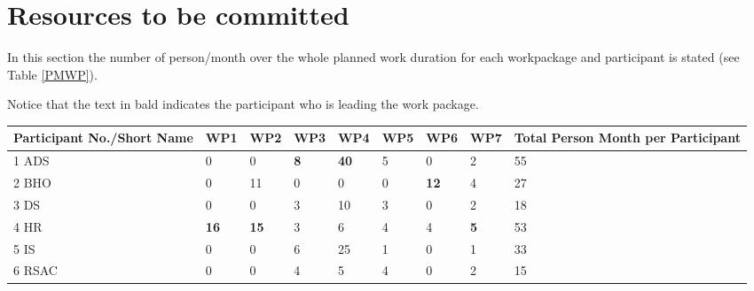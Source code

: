 \section{Resources to be committed}

In this section the number of person/month over the whole planned work duration for each workpackage and participant is stated (see Table \ref{PMWP}).

Notice that the text in bald indicates the participant who is leading the work package.

\begin{table}[H]
	\centering
	\begin{tabular}{p{1.9cm} p{1cm} p{1cm} p{1cm} p{1cm} p{1cm} p{1cm} p{1cm} | p{2.3cm}}
		\toprule[2pt]
		
		\textbf{Participant No./Short Name} & \textbf{WP1} & \textbf{WP2} & \textbf{WP3} & \textbf{WP4} & \textbf{WP5} & \textbf{WP6} & \textbf{WP7} & \textbf{Total Person Month per Participant} \\
		
		\midrule[1.5pt] 
		
		 1 ADS & 0 & 0 & \textbf{8} & \textbf{40} & 5 & 0 & 2 &  55 \vspace{0.2cm} \\
		
		\midrule
	
		 2 BHO & 0 & 11 & 0 & 0 & 0 & \textbf{12} & 4 & 27 \vspace{0.2cm} \\
		
		\midrule
		
		 3 DS & 0 & 0 & 3 & 10 & 3 & 0 & 2 & 18 \vspace{0.2cm} \\
	
		\midrule
	
	 	 4 HR & \textbf{16} & \textbf{15} & 3 & 6 & 4 & 4 & \textbf{5} & 53 \vspace{0.2cm} \\
	 	 
	 	 \midrule
	 	 
	 	 5 IS & 0 & 0 & 6 & 25 & 1 & 0 & 1 & 33 \vspace{0.2cm} \\
	 	 
	 	 \midrule
	 	 
	 	 6 RSAC & 0 & 0 & 4 & 5 & 4 & 0 & 2 & 15 \vspace{0.2cm} \\
	 	 
	 	 \midrule
	 	 

\end{tabular}
\end{table}
